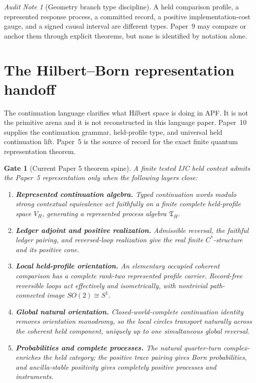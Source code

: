 \documentclass[11pt]{article}
\newtheorem{gate}[theorem]{Gate}
\theoremstyle{remark}
\newtheorem{audit}[theorem]{Audit Note}
\newcommand{\Vh}{V_H}
\newcommand{\Th}{\mathfrak T_H}
\begin{document}
\begin{audit}[Geometry branch type discipline]
A held comparison profile, a represented response process, a committed record, a positive implementation-cost gauge, and a signed causal interval are different types.  Paper~9 may compare or anchor them through explicit theorems, but none is identified by notation alone.
\end{audit}

\section{The Hilbert--Born representation handoff}

The continuation language clarifies what Hilbert space is doing in APF.  It is not the primitive arena and it is not reconstructed in this language paper.  Paper~10 supplies the continuation grammar, held-profile type, and universal held continuation lift.  Paper~5 is the source of record for the exact finite quantum representation theorem.

\begin{gate}[Current Paper 5 theorem spine]
A finite tested IJC held context admits the Paper~5 representation only when the following layers close:
\begin{enumerate}
\item \textbf{Represented continuation algebra.} Typed continuation words modulo strong contextual equivalence act faithfully on a finite complete held-profile space \(\Vh\), generating a represented process algebra \(\Th\).
\item \textbf{Ledger adjoint and positive realization.} Admissible reversal, the faithful ledger pairing, and reversed-loop realization give the real finite \(C^*\)-structure and its positive cone.
\item \textbf{Local held-profile orientation.} An elementary occupied coherent comparison has a complete rank-two represented profile carrier.  Record-free reversible loops act effectively and isometrically, with nontrivial path-connected image \(SO(2)\cong S^1\).
\item \textbf{Global natural orientation.} Closed-world-complete continuation identity removes orientation monodromy, so the local circles transport naturally across the coherent held component, uniquely up to one simultaneous global reversal.
\item \textbf{Probabilities and complete processes.} The natural quarter-turn complex-enriches the held category; the positive trace pairing gives Born probabilities, and ancilla-stable positivity gives completely positive processes and instruments.
\end{enumerate}
\end{gate}
\end{document}
